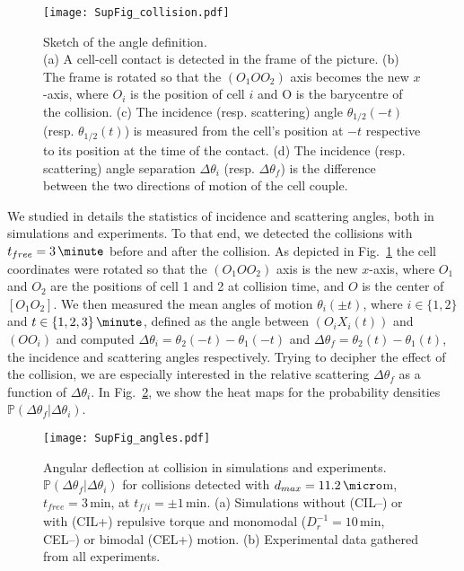 \documentclass[11pt, twocolumn]{article}
\begin{document}
\begin{figure*}[ht!]
\centering
\texttt{[image: SupFig\_collision.pdf]}

\caption{Sketch of the angle definition.\\
  (a) A cell-cell contact is detected in the frame of the picture.
  (b) The frame is rotated so that the $(O_1OO_2)$ axis becomes the new
  $x$-axis, where $O_{i}$ is the position of cell $i$ and O is the
  barycentre of the collision.  (c) The incidence (resp. scattering)
  angle $\theta_{1/2}(-t)$ (resp. $\theta_{1/2}(t)$) is measured from
  the cell's position at $-t$ respective to its position at the time
  of the contact.  (d) The incidence (resp. scattering) angle separation
  $\Delta\theta_i$ (resp. $\Delta\theta_f$) is the difference between
  the two directions of motion of the cell couple.}
\label{fig:sup_collision}
\end{figure*}

We studied in details the statistics of incidence and scattering
angles, both in simulations and experiments. To that end, we detected
the collisions with $t_{free}=3\,\minute$ before and after the
collision. As depicted in Fig.~\ref{fig:sup_collision} the cell
coordinates were rotated so that the $(O_1OO_2)$ axis is the new
$x$-axis, where $O_1$ and $O_2$ are the positions of cell 1 and 2 at
collision time, and $O$ is the center of $[O_1O_2]$. We then measured
the mean angles of motion $\theta_i(\pm t)$, where $i\in\{1,2\}$ and
$t\in\{1,2,3\}\,\minute$, defined as the angle between $(O_iX_i(t))$ and
$(OO_i)$ and computed $\Delta\theta_{i}=\theta_2(-t)-\theta_1(-t)$
and $\Delta\theta_{f}=\theta_2(t)-\theta_1(t)$, the incidence and scattering
angles respectively. Trying to decipher the effect of the collision,
we are especially interested in the relative scattering $\Delta\theta_f$
as a function of $\Delta\theta_i$. In Fig.~\ref{fig:sup_angles}, we show
the heat maps for the probability densities $\mathbb{P}(\Delta\theta_f|\Delta\theta_i)$.


\begin{figure*}[ht!]
\centering
\texttt{[image: SupFig\_angles.pdf]}

\caption{Angular deflection at collision in simulations and experiments.\\
  $\mathbb{P}(\Delta\theta_f|\Delta\theta_i)$ for collisions detected with
  $d_{max}=11.2\,\micro$m, $t_{free}=3\,$min, at
  $t_{f/i}=\pm1\,$min. (a) Simulations without (CIL--) or with (CIL+) repulsive torque
  and monomodal ($D_r^{-1}=10\,$min, CEL--) or bimodal (CEL+) motion.
  (b) Experimental data gathered from all experiments.}
\label{fig:sup_angles}
\end{figure*}
\end{document}
